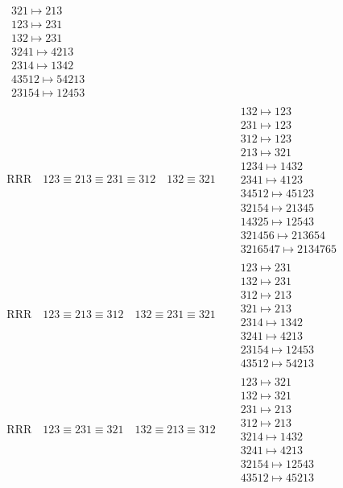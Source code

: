 \documentclass{article}
\begin{document}
\begin{align}
\begin{matrix}
321 \mapsto 213
\\
123 \mapsto 231
\\
132 \mapsto 231
\\
3241 \mapsto 4213
\\
2314 \mapsto 1342
\\
43512 \mapsto 54213
\\
23154 \mapsto 12453
\end{matrix}
\\
\text{RRR}
\quad
123\equiv213\equiv231\equiv312
\quad
132\equiv321
\quad
&
\begin{matrix}
132 \mapsto 123
\\
231 \mapsto 123
\\
312 \mapsto 123
\\
213 \mapsto 321
\\
1234 \mapsto 1432
\\
2341 \mapsto 4123
\\
34512 \mapsto 45123
\\
32154 \mapsto 21345
\\
14325 \mapsto 12543
\\
321456 \mapsto 213654
\\
3216547 \mapsto 2134765
\end{matrix}
\\
\text{RRR}
\quad
123\equiv213\equiv312
\quad
132\equiv231\equiv321
\quad
&
\begin{matrix}
123 \mapsto 231
\\
132 \mapsto 231
\\
312 \mapsto 213
\\
321 \mapsto 213
\\
2314 \mapsto 1342
\\
3241 \mapsto 4213
\\
23154 \mapsto 12453
\\
43512 \mapsto 54213
\end{matrix}
\\
\text{RRR}
\quad
123\equiv231\equiv321
\quad
132\equiv213\equiv312
\quad
&
\begin{matrix}
123 \mapsto 321
\\
132 \mapsto 321
\\
231 \mapsto 213
\\
312 \mapsto 213
\\
3214 \mapsto 1432
\\
3241 \mapsto 4213
\\
32154 \mapsto 12543
\\
43512 \mapsto 45213
\end{matrix}

\end{align}
\end{document}
